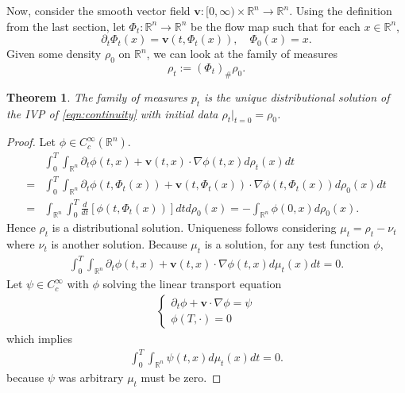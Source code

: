 \documentclass[12pt]{article}
\newcommand{\R}{\mathbb{R}}
\theoremstyle{plain}
\newtheorem{thm}{Theorem}[section]
\numberwithin{equation}{section}
\begin{document}
Now, consider the smooth vector field $\mathbf{v}: [0,\infty)\times \mathbb{R}^n\to \mathbb{R}^n.$
Using the definition from the last section, let $\Phi_t: \mathbb{R}^n\to \mathbb{R}^n$ be the flow map such that for each $x\in \mathbb{R}^n$,
\[\partial_t\Phi_t(x) = \mathbf{v}(t,\Phi_t(x)),\quad \Phi_0(x) = x.\]
Given some density $\rho_0$ on $\mathbb{R}^n$, we can look at the family of measures 
\[\rho_t := (\Phi_t)_\# \rho_0.\]
\begin{thm}
	The family of measures $p_t$ is the unique distributional solution of the IVP of \eqref{eqn:continuity} with initial data $\rho_t\vert_{t=0} = \rho_0$.
\end{thm}
\begin{proof}
	Let $\phi\in C^\infty_c(\mathbb{R}^n)$.
	\begin{align*}
		&\int_0^T \int_{\mathbb{R}^n}\partial_t\phi(t,x) + \mathbf{v}(t,x)\cdot \nabla\phi(t,x)d\rho_t(x)dt\\
	  = &\int_0^T\int_{\mathbb{R}^n}\partial_t\phi(t,\Phi_t(x)) + \mathbf{v}(t,\Phi_t(x))\cdot \nabla\phi(t,\Phi_t(x))d\rho_0(x)dt \\
	  = &\int_{\mathbb{R}^n}\int_0^T \frac{d}{dt}[\phi(t,\Phi_t(x))]dtd\rho_0(x) = - \int_{\mathbb{R}^n}\phi(0,x)d\rho_0(x).
	\end{align*}
	Hence $\rho_t$ is a distributional solution. Uniqueness follows considering $\mu_t = \rho_t-\nu_t$ where $\nu_t$ is another solution.
  Because $\mu_t$ is a solution, for any test function $\phi$,
  \begin{align*}
    \int_0^T \int_{\R^n}\partial_t\phi(t,x) + \mathbf{v}(t,x)\cdot\nabla\phi(t,x)d\mu_{t}(x)dt = 0.
  \end{align*}
  Let $\psi\in C_c^\infty$ with $\phi$ solving the linear transport equation
  \begin{align*}
    \begin{cases}
      \partial_t\phi + \mathbf{v}\cdot \nabla \phi = \psi \\
      \phi(T,\cdot) = 0
    \end{cases}
  \end{align*}
  which implies 
  \begin{align*}
    \int_0^T \int_{\R^n}\psi(t,x)d\mu_{t}(x)dt = 0.
  \end{align*}
  because $\psi$ was arbitrary $\mu_t$ must be zero.
\end{proof}
\end{document}
